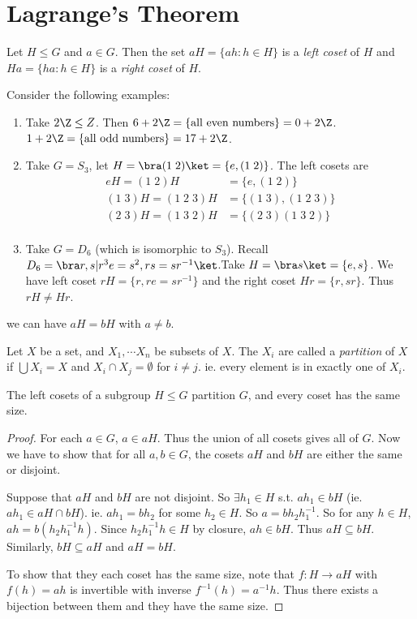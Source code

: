 \documentclass[a4paper]{article}
\begin{document}
\section{Lagrange's Theorem}
\begin{defi}[Cosets]
  Let $H\leq G$ and $a\in G$. Then the set $aH =\{ah : h\in H\}$ is a \emph{left coset} of $H$  and $Ha = \{ha : h\in H\}$ is a \emph{right coset} of $H$.
\end{defi}
\begin{eg}
  Consider the following examples:
  \begin{enumerate}
    \item Take $2\Z \leq Z$. Then $6 + 2\Z = \{\text{all even numbers}\} = 0 + 2\Z$. $1 + 2\Z = \{\text{all odd numbers}\} = 17 + 2\Z$.
    \item Take $G = S_3$, let $H = \bra (1\; 2)\ket = \{e, (1\; 2)\}$. The left cosets are
      \begin{align*}
        eH = (1\; 2)H &= \{e, (1\; 2)\}\\
        (1\; 3)H = (1\; 2\; 3)H &= \{(1\; 3), (1\; 2\; 3)\}\\
        (2\; 3)H = (1\; 3\; 2)H &= \{(2\; 3)(1\; 3\; 2)\}\\
      \end{align*}
    \item Take $G = D_6$ (which is isomorphic to $S_3$). Recall $D_6 = \bra r, s | r^3 e = s^2, rs = sr^{-1}\ket$.Take $H = \bra s\ket = \{e, s\}$. We have left coset $rH = \{r, re = sr^{-1}\}$ and the right coset $Hr = \{r, sr\}$. Thus $rH \not= Hr$.
  \end{enumerate}
\end{eg}
\note we can have $aH = bH$ with $a\not= b$.

\begin{defi}[Partition]
  Let $X$ be a set, and $X_1, \cdots X_n$ be subsets of $X$. The $X_i$ are called a \emph{partition} of $X$ if $\bigcup X_i = X$ and $X_i\cap X_j = \emptyset$ for $i\not= j$. ie. every element is in exactly one of $X_i$.
\end{defi}

\begin{lemma}
  The left cosets of a subgroup $H\leq G$ partition $G$, and every coset has the same size.
\end{lemma}

\begin{proof}
  For each $a\in G$, $a\in aH$. Thus the union of all cosets gives all of $G$. Now we have to show that for all $a, b\in G$, the cosets $aH$ and $bH$ are either the same or disjoint.

  Suppose that $aH$ and $bH$ are not disjoint. So $\exists h_1\in H$ s.t. $ah_1\in bH$ (ie. $ah_1\in aH\cap bH$). ie. $ah_1 = bh_2$ for some $h_2\in H$. So $a = bh_2h_1^{-1}$. So for any $h\in H$, $ah = b(h_2h_1^{-1}h)$. Since $h_2h_1^{-1}h\in H$ by closure, $ah\in bH$. Thus $aH\subseteq bH$. Similarly, $bH\subseteq aH$ and $aH = bH$.

  To show that they each coset has the same size, note that $f: H \to aH$ with $f(h) = ah$ is invertible with inverse $f^{-1}(h) = a^{-1}h$. Thus there exists a bijection between them and they have the same size.
\end{proof}
\end{document}

